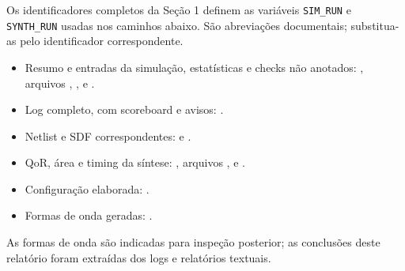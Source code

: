 \documentclass[11pt,a4paper]{article}
\begin{document}
Os identificadores completos da Seção 1 definem as variáveis
\texttt{SIM\_RUN} e \texttt{SYNTH\_RUN} usadas nos caminhos abaixo.
São abreviações documentais; substitua-as pelo identificador correspondente.

\begin{itemize}
\item Resumo e entradas da simulação, estatísticas e checks não anotados:
, arquivos
, ,
 e .
\item Log completo, com scoreboard e avisos:
.
\item Netlist e SDF correspondentes:
 e
.
\item QoR, área e timing da síntese:
, arquivos
,  e .
\item Configuração elaborada:
.
\item Formas de onda geradas:
.
\end{itemize}

As formas de onda são indicadas para inspeção posterior; as conclusões
deste relatório foram extraídas dos logs e relatórios textuais.
\end{document}
